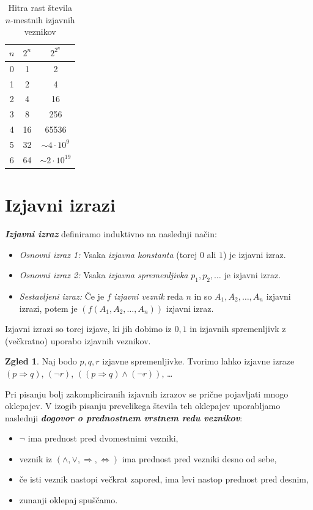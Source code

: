 \documentclass[11pt]{book}
\def\definicija{\color{rdeca}\bf\em}
\theoremstyle{definition}
\theoremstyle{zgled}
\newtheorem*{zgled}{Zgled}
\theoremstyle{odprtproblem}
\theoremstyle{domacanaloga}
\theoremstyle{izrek}
\begin{document}
\begin{table}[h]
    \centering
    \begin{tabular}{c|cc}
        $n$ & $2^n$ & $2^{2^n}$ \\ \hline
        0 & 1 & 2 \\
        1 & 2 & 4 \\
        2 & 4 & 16 \\
        3 & 8 & 256 \\
        4 & 16 & 65536 \\
        5 & 32 & $\sim 4 \cdot 10^9$ \\
        6 & 64 & $\sim 2 \cdot 10^{19}$
    \end{tabular}
    \caption{Hitra rast števila $n$-mestnih izjavnih veznikov}
\end{table}

\section{Izjavni izrazi}

{\definicija Izjavni izraz} definiramo induktivno na naslednji način:
\begin{itemize}
    \item \emph{Osnovni izraz 1:} Vsaka \emph{izjavna konstanta} (torej $0$ ali $1$) je izjavni izraz. 
    \item \emph{Osnovni izraz 2:} Vsaka \emph{izjavna spremenljivka} $p_1, p_2, \dots$ je izjavni izraz.
    \item \emph{Sestavljeni izraz:} Če je $f$ \emph{izjavni veznik} reda $n$ in so $A_1, A_2, \dots, A_n$ izjavni izrazi, potem je $(f(A_1,A_2,\dots,A_n))$ izjavni izraz.
\end{itemize}

Izjavni izrazi so torej izjave, ki jih dobimo iz $0,1$ in izjavnih spremenljivk z (večkratno) uporabo izjavnih veznikov.

\begin{zgled}
    Naj bodo $p,q,r$ izjavne spremenljivke. Tvorimo lahko izjavne izraze $(p \Rightarrow q)$, $(\lnot r)$, $((p \Rightarrow q) \land (\lnot r))$, \dots
\end{zgled}

Pri pisanju bolj zakompliciranih izjavnih izrazov se prične pojavljati mnogo oklepajev. V izogib pisanju prevelikega števila teh oklepajev uporabljamo naslednji {\definicija dogovor o prednostnem vrstnem redu veznikov}:
\begin{itemize}
    \item $\lnot$ ima prednost pred dvomestnimi vezniki,
    \item veznik iz $(\land, \lor, \Rightarrow, \Leftrightarrow)$ ima prednost pred vezniki desno od sebe,
    \item če isti veznik nastopi večkrat zapored, ima levi nastop prednost pred desnim,
    \item zunanji oklepaj spuščamo.
\end{itemize}
\end{document}
